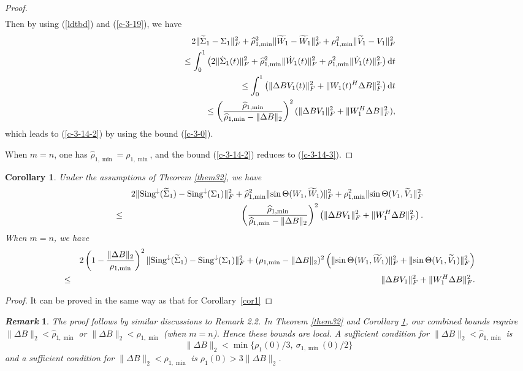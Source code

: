 \documentclass[11pt,a4paper]{article}
\numberwithin{equation}{section}
\newcommand {\eqn}  {\begin{eqnarray}}
\newcommand {\enn} {\end{eqnarray}}
\newtheorem{Corollary}{Corollary}[section]
\newtheorem{Remark}{{\it Remark}}[section]
\newcommand {\wh} {\widehat}
\newcommand {\wt} {\widetilde}
\begin{document}
\begin{proof}
\begin{eqnarray}
\end{eqnarray}
Then by using (\ref{ldtbd}) and (\ref{c-3-19}), we have
\eqn
\nonumber
&&2\|{\wt\Sigma_1-\Sigma_1}\|_F^2+\wh \rho_{1,\min}^2\|{\wt W_1-\wt W_1}\|_F^2+
\rho_{1,\min}^2\|{\wt V_1-V_1}\|_F^2\\
\nonumber
&&\qquad\qquad \le \int_0^1\left(2\|{\dot\Sigma_1(t)}\|_F^2+\wh\rho_{1,\min}^2\|{\dot W_{1}(t)}\|_F^2+
\rho_{1,\min}^2\|{\dot V_{1}(t)}\|_F^2\right){\rm d}t\\
\label{lint}
&&\qquad\qquad\le\int_0^1\left(\|{\Delta BV_1(t)}\|_F^2+
\|{W_1(t)^H\Delta B}\|_F^2\right){\rm d}t \\
\nonumber
&&\qquad\qquad\le \left(\frac{\wh \rho_{1,\min}}{\wh \rho_{1,\min}-\|{\Delta B}\|_2}\right)^2
(\|{\Delta BV_1}\|_F^2+\|{W_1^H\Delta B}\|_F^2),
\enn
which leads to (\ref{c-3-14-2}) by using the bound (\ref{c-3-0}).

When $m=n$, one has $\wh \rho_{1,\min}=\rho_{1,\min}$, and the bound (\ref{c-3-14-2}) reduces to  (\ref{c-3-14-3}).
\end{proof}

\medskip

\begin{Corollary}\label{cor31}
Under the assumptions of Theorem \ref{them32}, we have
{\footnotesize\begin{eqnarray*}
&&2\|{{\rm Sing}^{\downarrow}(\wt\Sigma_1)-{\rm Sing}^{\downarrow}(\Sigma_1)}\|_F^2+\wh \rho_{1,\min}^2\|{\sin\Theta(W_1,\wt W_1)}\|_F^2+
\rho_{1,\min}^2\|{\sin\Theta(V_1, \wt V_1}\|_F^2\nonumber\\
& \le&
\left(\frac{\wh \rho_{1,\min}}{\wh \rho_{1,\min}-\|{\Delta B}\|_2}\right)^2\left(\|{\Delta BV_1}\|_F^2+\|{W_1^H\Delta B}\|_F^2\right).
\end{eqnarray*}}
When $m=n$,  we have
{\footnotesize\begin{eqnarray*}
 &&2\left(1-\frac{\|{\Delta B}\|_2}{\rho_{1,\min}}\right)^2
\|{{\rm Sing}^{\downarrow}(\wt\Sigma_1)-{\rm Sing}^{\downarrow}(\Sigma_1)}\|_F^2+(\rho_{1,\min}-\|\Delta B\|_2)^2\left(\|{\sin\Theta(W_1,\wt W_1)}\|_F^2+
\|{\sin\Theta(V_1, \wt V_1)}\|_F^2\right)\\
& \le&
\|{\Delta B V_1}\|_F^2+\|{W_1^H\Delta B}\|_F^2.
\end{eqnarray*}}
\end{Corollary}
\begin{proof}
It can be proved in the same way as that for Corollary~\ref{cor1}
\end{proof}\vskip 2mm

\begin{Remark}\label{rem351} The proof follows by similar discussions to Remark 2.2.
In Theorem \ref{them32} and Corollary \ref{cor31}, our combined bounds require $\|\Delta B\|_2<\wh\rho_{1,\min}$ or $\|\Delta B\|_2<\rho_{1,\min}$ (when $m=n$). Hence these bounds are local. A sufficient condition for $\|\Delta B\|_2<\wh\rho_{1,\min}$ is
$$\|\Delta B\|_2<\min\{\rho_1(0)/3,~\sigma_{1,\min}(0)/2\}$$
and a sufficient condition for $\|\Delta B\|_2<\rho_{1,\min}$ is
$\rho_1(0)>3\|\Delta B\|_2$.
\end{Remark}
\vskip 2mm
\end{document}
